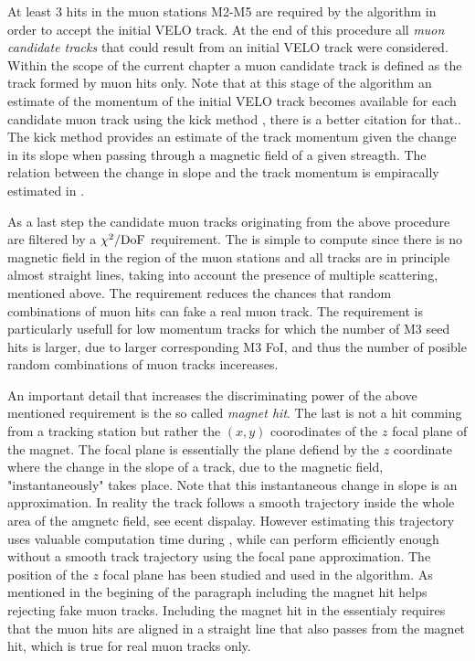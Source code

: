 At least 3 hits in the muon stations M2-M5 are required by the \mvm algorithm in order to accept the initial VELO track.
At the end of this procedure all {\it muon candidate tracks} that could result from an initial VELO track were considered.
Within the scope of the current chapter a muon candidate track is defined as the track formed by muon hits only.
Note that at this stage of the algorithm an estimate of the momentum of the initial VELO track becomes available
for each candidate muon track using the kick method \cite{roelThesis}, {\color{red} there is a better citation for that.}.
The kick method provides an estimate of the track momentum given the change in its slope when passing through a magnetic
field of a given streagth. The relation between the change in slope and the track momentum is empiracally estimated
in \cite{roelThesis}.

As a last step the candidate muon tracks originating from the above procedure are filtered by a $\chi^2/{\rm DoF}$
requirement. The \chisq is simple to compute since there is no magnetic field in the region of the muon stations
and all tracks are in principle almost straight lines, taking into account the presence of multiple scattering, mentioned above.
The \chisq requirement reduces the chances that random combinations of muon hits can fake a real muon track.
The requirement is particularly usefull for low momentum tracks for which the number of M3 seed hits is larger,
due to larger corresponding M3 FoI, and thus the number of posible random combinations of muon tracks incereases.

An important detail that increases the discriminating power of the above mentioned \chisq requirement is the
so called {\it magnet hit}. The last is not a hit comming from a tracking station but rather the $(x,y)$ coorodinates
of the $z$ focal plane of the \lhcb magnet. The focal plane is essentially the plane defiend by the $z$ coordinate
where the change in the slope of a track, due to the magnetic field,  "instantaneously" takes place. Note that this
instantaneous change in slope is an approximation. In reality the track follows a smooth trajectory inside the whole
area of the amgnetc field, see {\color{red} ecent dispalay}. However estimating this trajectory uses valuable computation time during \hltone, while
\mvm can perform efficiently enough without a smooth track trajectory using the focal pane approximation.
The position of the $z$ focal plane has been studied \cite{} and used in the \mvm algorithm.
As mentioned in the begining of the paragraph including the magnet hit helps rejecting fake muon tracks.
Including the magnet hit in the \chisq essentialy requires that the muon hits are aligned in a straight line that
also passes from the magnet hit, which is true for real muon tracks only.

